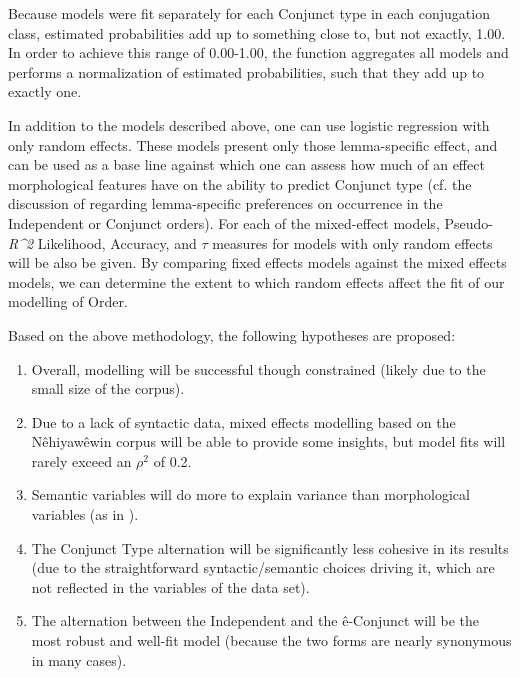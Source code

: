 Because models were fit separately for each Conjunct type in each conjugation class, estimated probabilities add up to something close to, but not exactly, 1.00. In order to achieve this range of 0.00-1.00, the  function \citep{polytomous} aggregates all models and performs a normalization of estimated probabilities, such that they add up to exactly one.

In addition to the models described above, one can use logistic regression with only random effects. These models present only those lemma-specific effect, and can be used as a base line against which one can assess how much of an effect morphological features have on the ability to predict Conjunct type (cf. the discussion of \citet{HarriganArppe2015} regarding lemma-specific preferences on occurrence in the Independent or Conjunct orders). For each of the mixed-effect models, Pseudo-\textit{R^{2}} Likelihood, Accuracy, and $\tau$ measures for models with only random effects will be also be given. By comparing fixed effects models against the mixed effects models, we can determine the extent to which random effects affect the fit of our modelling of Order.

Based on the above methodology, the following hypotheses are proposed:

\begin{enumerate}
    \item Overall, modelling will be successful though constrained (likely due to the small size of the corpus).
    \item Due to a lack of syntactic data, mixed effects modelling based on the Nêhiyawêwin corpus will be able to provide some insights, but model fits will rarely exceed an $\rho^{2}$ of 0.2.
    \item Semantic variables will do more to explain variance than morphological variables (as in \citep{arppe2008univariate}).
    \item The Conjunct Type alternation will be significantly less cohesive in its results (due to the straightforward syntactic/semantic choices driving it, which are not reflected in the variables of the data set).
    \item The alternation between the Independent and the ê-Conjunct will be the most robust and well-fit model (because the two forms are nearly synonymous in many cases).
\end{enumerate}